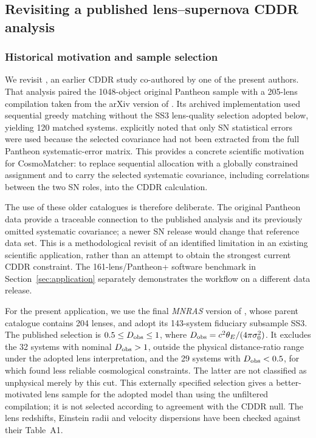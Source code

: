 \subsection{Revisiting a published lens--supernova CDDR analysis}\label{sec:app_cddr143}
\subsubsection{Historical motivation and sample selection}
We revisit \citet{Zhou2021}, an earlier CDDR study co-authored by one of the present authors. That analysis paired the 1048-object original Pantheon sample \citep{Scolnic2018} with a 205-lens compilation taken from the arXiv version of \citet{Amante2020}. Its archived implementation used sequential greedy matching without the SS3 lens-quality selection adopted below, yielding 120 matched systems. \citet{Zhou2021} explicitly noted that only SN statistical errors were used because the selected covariance had not been extracted from the full Pantheon systematic-error matrix. This provides a concrete scientific motivation for CosmoMatcher: to replace sequential allocation with a globally constrained assignment and to carry the selected systematic covariance, including correlations between the two SN roles, into the CDDR calculation.

The use of these older catalogues is therefore deliberate. The original Pantheon data provide a traceable connection to the published analysis and its previously omitted systematic covariance; a newer SN release would change that reference data set. This is a methodological revisit of an identified limitation in an existing scientific application, rather than an attempt to obtain the strongest current CDDR constraint. The 161-lens/Pantheon+ software benchmark in Section~\ref{sec:application} separately demonstrates the workflow on a different data release.

For the present application, we use the final \emph{MNRAS} version of \citet{Amante2020}, whose parent catalogue contains 204 lenses, and adopt its 143-system fiduciary subsample SS3. The published selection is $0.5\leq D_{\rm obs}\leq1$, where $D_{\rm obs}=c^2\theta_E/(4\pi\sigma_0^2)$. It excludes the 32 systems with nominal $D_{\rm obs}>1$, outside the physical distance-ratio range under the adopted lens interpretation, and the 29 systems with $D_{\rm obs}<0.5$, for which \citet{Amante2020} found less reliable cosmological constraints. The latter are not classified as unphysical merely by this cut. This externally specified selection gives a better-motivated lens sample for the adopted model than using the unfiltered compilation; it is not selected according to agreement with the CDDR null. The lens redshifts, Einstein radii and velocity dispersions have been checked against their Table~A1.

